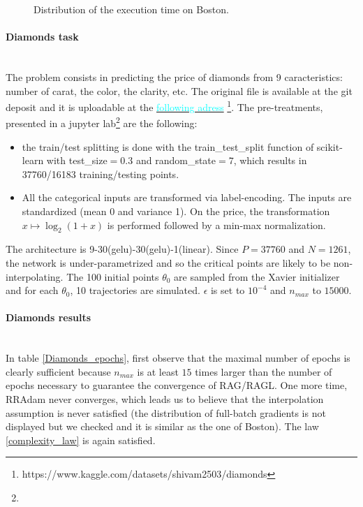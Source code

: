 \begin{figure}[h!]
	\centering
	\scalebox{0.7}{}
	\caption{Distribution of the execution time on Boston.}
	\label{Boston_time}
\end{figure}

\paragraph{Diamonds task}
~~\\
The problem consists in predicting the price of diamonds from 9 caracteristics: number of carat, the color, the clarity, etc. The original file is available at the git deposit and
it is uploadable at the \href{https://www.kaggle.com/datasets/shivam2503/diamonds}{\textcolor{cyan}{following adress}}
\footnote{https://www.kaggle.com/datasets/shivam2503/diamonds}. The pre-treatments, presented in a jupyter lab\footnote{} are the following:
\begin{itemize}
	\item the train/test splitting is done with the train\_test\_split function of scikit-learn with test\_size$=0.3$ and random\_state$=7$, which results in \\ 37760/16183 training/testing points. 
	\item All the categorical inputs are transformed via label-encoding. The inputs are standardized (mean 0 and variance 1). On the price, the transformation $x \mapsto \log_2(1+x)$ is performed followed by a min-max normalization. 
\end{itemize}
The architecture is 9-30(gelu)-30(gelu)-1(linear). Since $P=37760$ and $N=1261$, the network is under-parametrized and so the critical points are likely to be non-interpolating.
The 100 initial points $\theta_0$ are sampled from the Xavier initializer and for each $\theta_0$, 10 trajectories are simulated. $\epsilon$ is set to $10^{-4}$ and $n_{max}$ to $15000$.

\paragraph{Diamonds results}
~~\\
In table \ref{Diamonds_epochs}, first observe that the maximal number of epochs is clearly sufficient because $n_{max}$ is at least $15$ times larger than the number of epochs
necessary to guarantee the convergence of RAG/RAGL. One more time, RRAdam never converges, which leads us to believe that the interpolation assumption is never satisfied (the
distribution of full-batch gradients is not displayed but we checked and it is similar as the one of Boston). The law \eqref{complexity_law} is again satisfied. 

